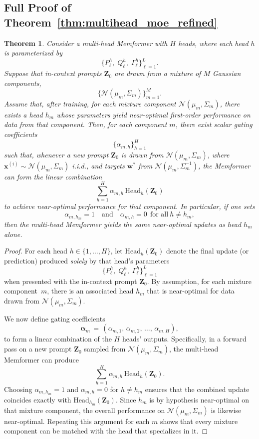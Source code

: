 \documentclass[11pt]{article}
\newtheorem*{theorem*}{Theorem}
\theoremstyle{plain}
\theoremstyle{definition}
\theoremstyle{remark}
\numberwithin{equation}{section}
\begin{document}
\subsection{Full Proof of Theorem~\ref{thm:multihead_moe_refined}}

\begin{theorem*}
Consider a multi-head Memformer with $H$ heads, where each head $h$ is parameterized by
\[\bigl\{P_\ell^h,\; Q_\ell^h,\; \Gamma_\ell^h\bigr\}_{\ell=1}^L.\]
Suppose that in-context prompts $\mathbf{Z}_0$ are drawn from a mixture of $M$ Gaussian components,
\[\bigl\{\mathcal{N}(\mu_m, \Sigma_m)\bigr\}_{m=1}^M.\]
Assume that, after training, for each mixture component $\mathcal{N}(\mu_m,\Sigma_m)$, there exists a head $h_m$ whose parameters yield near-optimal first-order performance on data from that component. Then, for each component $m$, there exist scalar \emph{gating coefficients}
\[\{\alpha_{m,h}\}_{h=1}^H\]
such that, whenever a new prompt $\mathbf{Z}_0$ is drawn from $\mathcal{N}(\mu_m,\Sigma_m)$, where $\mathbf{x}^{(i)} \sim \mathcal{N}(\mu_m, \Sigma_m)$ i.i.d., and targets $\mathbf{w}^*$ from $\mathcal{N}(\mu_m, \Sigma_m^{-1})$, the Memformer can form the linear combination
\[\sum_{h=1}^H \alpha_{m,h}\,\mathrm{Head}_h(\mathbf{Z}_0)\]
to achieve near-optimal performance for that component. In particular, if one sets
\[\alpha_{m,h_m} = 1
\quad \text{and} \quad
\alpha_{m,h}=0 \ \ \text{for all} \ h \neq h_m,\]
then the multi-head Memformer yields the same near-optimal updates as head $h_m$ alone.
\end{theorem*}

\begin{proof}
For each head $h \in \{1,\dots,H\}$, let $\mathrm{Head}_h(\mathbf{Z}_0)$ denote the final update (or prediction) produced \emph{solely} by that head's parameters
\[
\bigl\{P_\ell^h,\; Q_\ell^h,\; \Gamma_\ell^h\bigr\}_{\ell=1}^L
\]
when presented with the in-context prompt $\mathbf{Z}_0$. By assumption, for each mixture component~$m$, there is an associated head $h_m$ that is near-optimal for data drawn from $\mathcal{N}(\mu_m,\Sigma_m)$. 

We now define gating coefficients
\[\boldsymbol{\alpha}_m
\,=\,(\alpha_{m,1},\,\alpha_{m,2},\,\dots,\,\alpha_{m,H}),\]
to form a linear combination of the $H$ heads' outputs. Specifically, in a forward pass on a new prompt $\mathbf{Z}_0$ sampled from $\mathcal{N}(\mu_m,\Sigma_m)$, the multi-head Memformer can produce
\[\sum_{h=1}^H \alpha_{m,h}\,\mathrm{Head}_h(\mathbf{Z}_0).\]
Choosing $\alpha_{m,h_m} = 1$ and $\alpha_{m,h} = 0$ for $h \neq h_m$ ensures that the combined update coincides exactly with $\mathrm{Head}_{h_m}(\mathbf{Z}_0)$. Since $h_m$ is by hypothesis near-optimal on that mixture component, the overall performance on $\mathcal{N}(\mu_m,\Sigma_m)$ is likewise near-optimal. Repeating this argument for each $m$ shows that every mixture component can be matched with the head that specializes in it.
\end{proof}
\end{document}
